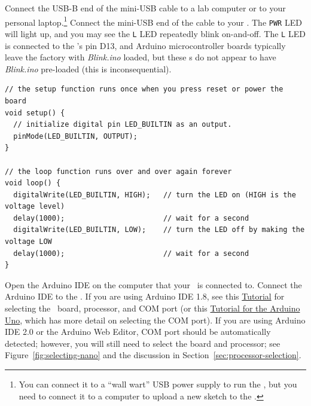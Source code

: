 Connect the USB-B end of the mini-USB cable to a lab computer or to your
personal laptop.\footnote{You can connect it to a ``wall wart'' USB power
supply to run the \nano, but you need to connect it to a computer to upload a
new sketch to the \nano.} Connect the mini-USB end of the cable to your \nano.
The \texttt{PWR} LED will light up, and you may see the \texttt{L} LED
repeatedly blink on-and-off. The \texttt{L} LED is connected to the \nano's pin
D13, and Arduino microcontroller boards typically leave the factory with
\textit{Blink.ino} loaded, but these \nano{}s do not appear to have
\textit{Blink.ino} pre-loaded (this is inconsequential).

\begin{lstlisting}[basicstyle=\ttfamily\footnotesize]
// the setup function runs once when you press reset or power the board
void setup() {
  // initialize digital pin LED_BUILTIN as an output.
  pinMode(LED_BUILTIN, OUTPUT);
}

// the loop function runs over and over again forever
void loop() {
  digitalWrite(LED_BUILTIN, HIGH);   // turn the LED on (HIGH is the voltage level)
  delay(1000);                       // wait for a second
  digitalWrite(LED_BUILTIN, LOW);    // turn the LED off by making the voltage LOW
  delay(1000);                       // wait for a second
}
\end{lstlisting}

Open the Arduino IDE on the computer that your \nano\ is connected to. Connect
the Arduino IDE to the \nano. If you are using Arduino IDE 1.8, see this
\href{https://www.arduino.cc/en/Guide/ArduinoNano#select-your-board-type-and-port}{Tutorial}
for selecting the \nano\ board, processor, and COM port (or this
\href{https://www.arduino.cc/en/Guide/ArduinoUno#select-your-board-type-and-port}{Tutorial
for the Arduino Uno}, which has more detail on selecting the COM port). If you
are using Arduino IDE 2.0 or the Arduino Web Editor, COM port should be
automatically detected; however, you will still need to select the board and
processor; see Figure~\ref{fig:selecting-nano} and the discussion in
Section~\ref{sec:processor-selection}.

